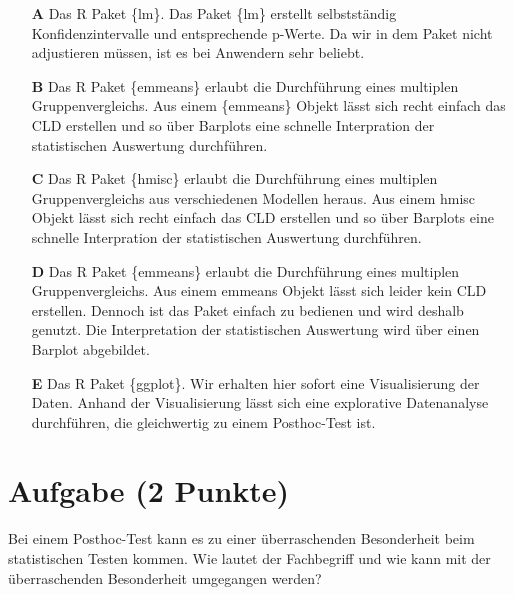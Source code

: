 \documentclass[a4paper, 9pt]{scrartcl}\usepackage[]{graphicx}\usepackage[]{xcolor}
\begin{document}
\begin{enumerate}
\item [\textbf{A} \msquare] Das R Paket \{lm\}. Das Paket \{lm\} erstellt selbstständig Konfidenzintervalle und entsprechende p-Werte. Da wir in dem Paket nicht adjustieren müssen, ist es bei Anwendern sehr beliebt.
\item [\textbf{B} \msquare] Das R Paket \{emmeans\} erlaubt die Durchführung eines multiplen Gruppenvergleichs. Aus einem \{emmeans\} Objekt lässt sich recht einfach das CLD erstellen und so über Barplots eine schnelle Interpration der statistischen Auswertung durchführen.
\item [\textbf{C} \msquare] Das R Paket \{hmisc\} erlaubt die Durchführung eines multiplen Gruppenvergleichs aus verschiedenen Modellen heraus. Aus einem hmisc Objekt lässt sich recht einfach das CLD erstellen und so über Barplots eine schnelle Interpration der statistischen Auswertung durchführen.
\item [\textbf{D} \msquare] Das R Paket \{emmeans\} erlaubt die Durchführung eines multiplen Gruppenvergleichs. Aus einem emmeans Objekt lässt sich leider kein CLD erstellen. Dennoch ist das Paket einfach zu bedienen und wird deshalb genutzt. Die Interpretation der statistischen Auswertung wird über einen Barplot abgebildet.
\item [\textbf{E} \msquare] Das R Paket \{ggplot\}. Wir erhalten hier sofort eine Visualisierung der Daten. Anhand der Visualisierung lässt sich eine explorative Datenanalyse durchführen, die gleichwertig zu einem Posthoc-Test ist.
\end{enumerate}

\section{Aufgabe \hfill (2 Punkte)}



Bei einem Posthoc-Test kann es zu einer überraschenden Besonderheit beim statistischen Testen kommen. Wie lautet der Fachbegriff und wie kann mit der überraschenden Besonderheit umgegangen werden?
\end{document}
